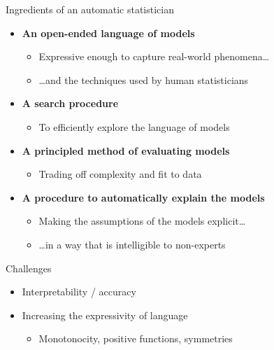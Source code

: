 \begin{frame}{Ingredients of an automatic statistician}
  \begin{center}
    \scalebox{0.5}{}
  \end{center}
  \begin{itemize}
    \footnotesize
    \item {\bf An open-ended language of models}
    \begin{itemize}
       \item Expressive enough to capture real-world phenomena\ldots
       \item \ldots and the techniques used by human statisticians
     \end{itemize}
    \item {\bf A search procedure}
    \begin{itemize}
       \item To efficiently explore the language of models
     \end{itemize}
    \item {\bf A principled method of evaluating models}
    \begin{itemize}
       \item Trading off complexity and fit to data
     \end{itemize}
    \item {\bf A procedure to automatically explain the models}
    \begin{itemize}
       \item Making the assumptions of the models explicit\ldots
       \item \ldots in a way that is intelligible to non-experts
     \end{itemize}
  \end{itemize}
\end{frame}\begin{frame}{Challenges}
  \begin{itemize}
    \item Interpretability / accuracy
    \vspace{\baselineskip}
    \item Increasing the expressivity of language
    \begin{itemize}
      \item \eg Monotonocity, positive functions, symmetries

\end{itemize}
\end{itemize}
\end{frame}
